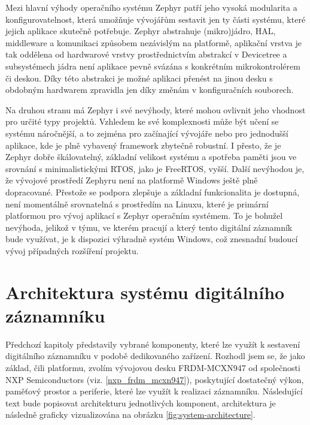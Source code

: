 Mezi hlavní výhody operačního systému Zephyr patří jeho vysoká modularita a konfigurovatelnost, která umožňuje vývojářům sestavit jen ty části systému, které jejich aplikace skutečně potřebuje. Zephyr abstrahuje (mikro)jádro, HAL, middleware a komunikaci způsobem nezávislým na platformě, aplikační vrstva je tak oddělena od hardwarové vrstvy prostřednictvím abstrakcí v Devicetree a subsystémech jádra není aplikace pevně svázána s konkrétním mikrokontrolérem či deskou. Díky této abstrakci je možné aplikaci přenést na jinou desku s obdobným hardwarem zpravidla jen díky změnám v konfiguračních souborech. \cite{zephyr_advantages}

Na druhou stranu má Zephyr i své nevýhody, které mohou ovlivnit jeho vhodnost pro určité typy projektů. Vzhledem ke své komplexnosti může být učení se systému náročnější, a to zejména pro začínající vývojáře nebo pro jednodušší aplikace, kde je plně vybavený framework zbytečně robustní. I přesto, že je Zephyr dobře škálovatelný, základní velikost systému a spotřeba paměti jsou ve srovnání s minimalistickými RTOS, jako je FreeRTOS, vyšší. Další nevýhodou je, že vývojové prostředí Zephyru není na platformě Windows ještě plně dopracované. Přestože se podpora zlepšuje a základní funkcionalita je dostupná, není momentálně srovnatelná s prostředím na Linuxu, které je primární platformou pro vývoj aplikací s Zephyr operačním systémem. To je bohužel nevýhoda, jelikož v týmu, ve kterém pracují a který tento digitální záznamník bude využívat, je k dispozici výhradně systém Windows, což znesnadní budoucí vývoj případných rozšíření projektu. \cite{nabto_guide_zephyr_vs_freertos}



\section{Architektura systému digitálního záznamníku}
\label{architektura_systemu_digitalniho_zaznamniku}
Předchozí kapitoly představily vybrané komponenty, které lze využít k sestavení digitálního záznamníku v podobě dedikovaného zařízení. Rozhodl jsem se, že jako základ, čili platformu, zvolím vývojovou desku FRDM-MCXN947 od společnosti NXP Semiconductors (viz. \ref{nxp_frdm_mcxn947}), poskytující dostatečný výkon, paměťový prostor a periferie, které lze využít k realizaci záznamníku. Následující text bude popisovat architekturu jednotlivých komponent, architektura je následně graficky vizualizována na obrázku \ref{fig:system-architecture}.

